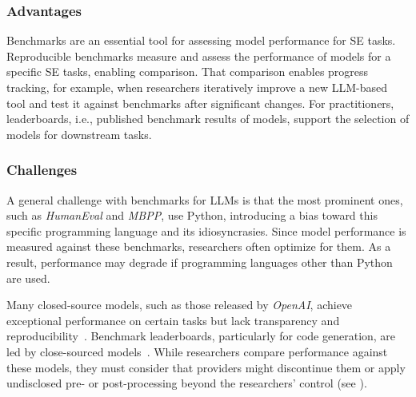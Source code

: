 \subsubsection{Advantages}

Benchmarks are an essential tool for assessing model performance for SE tasks.
Reproducible benchmarks measure and assess the performance of models for a specific SE tasks, enabling comparison.
That comparison enables progress tracking, for example, when researchers iteratively improve a new LLM-based tool and test it against benchmarks after significant changes.
For practitioners, leaderboards, i.e., published benchmark results of models, support the selection of models for downstream tasks.

\subsubsection{Challenges}

A general challenge with benchmarks for LLMs is that the most prominent ones, such as \emph{HumanEval} and \emph{MBPP}, use Python, introducing a bias toward this specific programming language and its idiosyncrasies.
Since model performance is measured against these benchmarks, researchers often optimize for them.
As a result, performance may degrade if programming languages other than Python are used.

Many closed-source models, such as those released by \emph{OpenAI}, achieve exceptional performance on certain tasks but lack transparency and reproducibility~\cite{DBLP:conf/nips/00110ZZDJLHL24, DBLP:journals/corr/abs-2308-01861, DBLP:journals/corr/abs-2406-15877}.
Benchmark leaderboards, particularly for code generation, are led by close-sourced models~\cite{DBLP:journals/corr/abs-2308-01861, DBLP:journals/corr/abs-2406-15877}.
While researchers \should compare performance against these models, they must consider that providers might discontinue them or apply undisclosed pre- or post-processing beyond the researchers' control (see \openllm).

